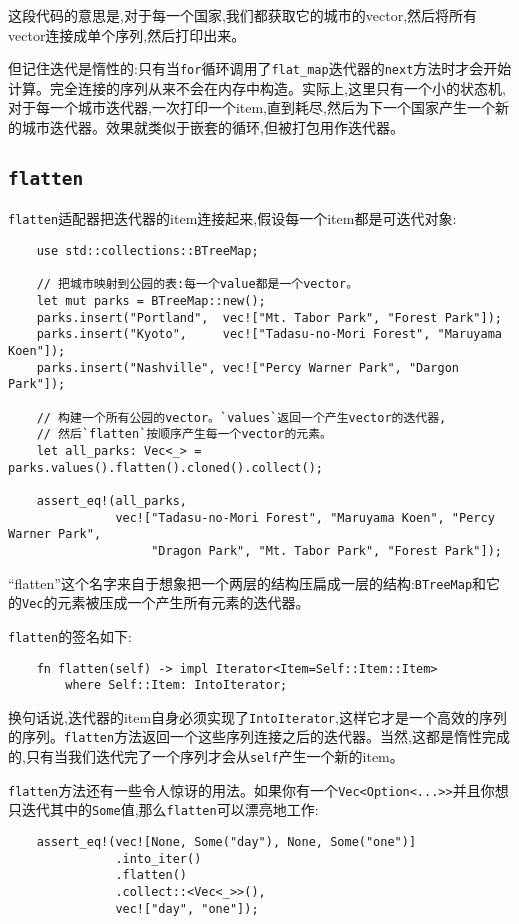 这段代码的意思是,对于每一个国家,我们都获取它的城市的vector,然后将所有vector连接成单个序列,然后打印出来。

但记住迭代是惰性的:只有当\texttt{for}循环调用了\texttt{flat\_map}迭代器的\texttt{next}方法时才会开始计算。完全连接的序列从来不会在内存中构造。实际上,这里只有一个小的状态机,对于每一个城市迭代器,一次打印一个item,直到耗尽,然后为下一个国家产生一个新的城市迭代器。效果就类似于嵌套的循环,但被打包用作迭代器。

\subsection{\texttt{flatten}}
\texttt{flatten}适配器把迭代器的item连接起来,假设每一个item都是可迭代对象:
\begin{verbatim}
    use std::collections::BTreeMap;

    // 把城市映射到公园的表:每一个value都是一个vector。
    let mut parks = BTreeMap::new();
    parks.insert("Portland",  vec!["Mt. Tabor Park", "Forest Park"]);
    parks.insert("Kyoto",     vec!["Tadasu-no-Mori Forest", "Maruyama Koen"]);
    parks.insert("Nashville", vec!["Percy Warner Park", "Dargon Park"]);

    // 构建一个所有公园的vector。`values`返回一个产生vector的迭代器,
    // 然后`flatten`按顺序产生每一个vector的元素。
    let all_parks: Vec<_> = parks.values().flatten().cloned().collect();

    assert_eq!(all_parks,
               vec!["Tadasu-no-Mori Forest", "Maruyama Koen", "Percy Warner Park", 
                    "Dragon Park", "Mt. Tabor Park", "Forest Park"]);
\end{verbatim}

“flatten”这个名字来自于想象把一个两层的结构压扁成一层的结构:\texttt{BTreeMap}和它的\texttt{Vec}的元素被压成一个产生所有元素的迭代器。

\texttt{flatten}的签名如下:
\begin{verbatim}
    fn flatten(self) -> impl Iterator<Item=Self::Item::Item>
        where Self::Item: IntoIterator;
\end{verbatim}

换句话说,迭代器的item自身必须实现了\texttt{IntoIterator},这样它才是一个高效的序列的序列。\texttt{flatten}方法返回一个这些序列连接之后的迭代器。当然,这都是惰性完成的,只有当我们迭代完了一个序列才会从\texttt{self}产生一个新的item。

\texttt{flatten}方法还有一些令人惊讶的用法。如果你有一个\texttt{Vec<Option<...>>}并且你想只迭代其中的\texttt{Some}值,那么\texttt{flatten}可以漂亮地工作:
\begin{verbatim}
    assert_eq!(vec![None, Some("day"), None, Some("one")]
               .into_iter()
               .flatten()
               .collect::<Vec<_>>(),
               vec!["day", "one"]);
\end{verbatim}

